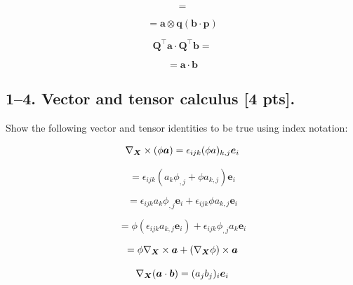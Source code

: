 \documentclass{article}
\begin{document}
\begin{equation*}
    = 
\end{equation*}


\begin{equation*}
    = \bm{a}\otimes\bm{q}(\bm{b} \cdot \bm{p})
\end{equation*}

\newpage


\begin{equation*}
    \bm{Q}^\intercal \bm{a} \cdot \bm{Q}^\intercal \bm{b} = 
\end{equation*}


\begin{equation*}
    = \bm{a} \cdot \bm{b}
\end{equation*}

\newpage


\subsection*{1--4. \textbf{Vector and tensor calculus} [4 pts].} Show the following vector and tensor identities to be true using index notation:

\begin{equation*}
    \nabla_{\bm{X}} \times (\phi \bm{a}) = \epsilon_{ijk} (\phi a)_{k,j} \bm{e}_{i}
\end{equation*}

\begin{equation*}
    = \epsilon_{ijk}(a_k \phi_{,j} + \phi a_{k,j})\bm{e}_{i}
\end{equation*}

\begin{equation*}
    = \epsilon_{ijk} a_k \phi_{,j} \bm{e}_{i} + \epsilon_{ijk} \phi a_{k,j} \bm{e}_{i}
\end{equation*}

\begin{equation*}
    = \phi(\epsilon_{ijk}  a_{k,j} \bm{e}_{i}) + \epsilon_{ijk} \phi_{,j} a_k \bm{e}_{i}
\end{equation*}

\begin{equation*}
    = \phi \nabla_{\bm{X}} \times \bm{a} + (\nabla_{\bm{X}}\phi) \times \bm{a}
\end{equation*}

\newpage


\begin{equation*}
    \nabla_{\bm{X}} (\bm{a} \cdot \bm{b}) = (a_j b_j)_i \bm{e}_i
\end{equation*}
\end{document}
